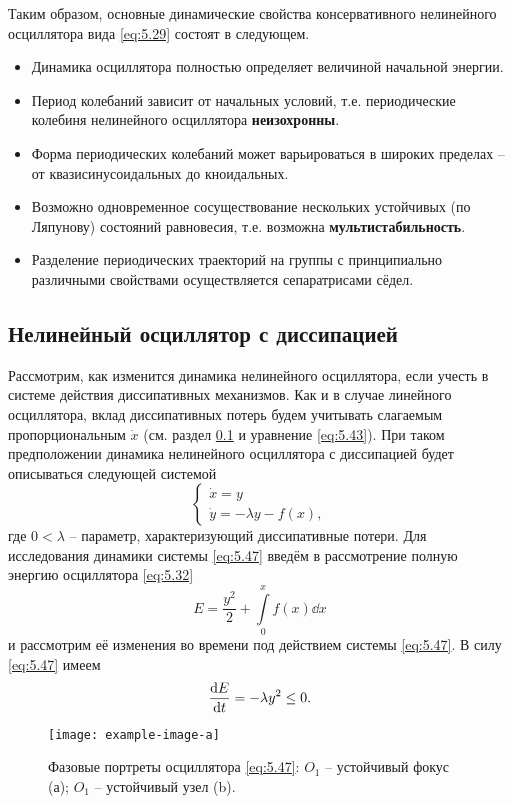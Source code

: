 Таким образом, основные динамические свойства консервативного нелинейного осциллятора вида \eqref{eq:5.29} состоят в следующем.
\begin{itemize}
        \item Динамика осциллятора полностью определяет величиной начальной энергии.
        \item Период колебаний зависит от начальных условий, т.е. периодические колебиня нелинейного осциллятора \textbf{неизохронны}.
        \item Форма периодических колебаний может варьироваться в широких пределах -- от квазисинусоидальных до кноидальных.
        \item Возможно одновременное сосуществование нескольких устойчивых (по Ляпунову) состояний равновесия, т.е. возможна \textbf{мультистабильность}.
\item Разделение периодических траекторий на группы с принципиально различными свойствами осуществляется сепаратрисами сёдел.
\end{itemize}

\subsection{Нелинейный осциллятор с диссипацией}%
\label{sub:5.2.2}

Рассмотрим, как изменится динамика нелинейного осциллятора, если
учесть в системе действия диссипативных механизмов. Как и в случае
линейного осциллятора, вклад диссипативных потерь будем учитывать
слагаемым пропорциональным $\dot x$ (см. раздел \ref{sub:5.2.2} и уравнение \eqref{eq:5.43}). При
таком предположении динамика нелинейного осциллятора с диссипацией будет
описываться следующей системой
\begin{equation}
        \label{eq:5.47}
        \begin{cases}
                \dot x = y\\
                \dot y = - \lambda y - f(x),
        \end{cases}
\end{equation}
где $0< \lambda$ -- параметр, характеризующий диссипативные потери. Для исследования динамики системы \eqref{eq:5.47} введём в рассмотрение полную энергию осциллятора \eqref{eq:5.32}
\begin{equation}
        \label{eq:}
        E = \frac{y^2}{2} + \int\limits_{0}^{x} f(x) \dd{x} 
\end{equation}
и рассмотрим её изменения во времени под действием системы \eqref{eq:5.47}. В силу \eqref{eq:5.47}
имеем
\begin{equation}
        \label{eq:5.48}
        \dv{E}{t} = -\lambda y^2 \leq 0.
\end{equation}
\begin{figure}[h]
        \centering
        \texttt{[image: example-image-a]}
        \caption{Фазовые портреты осциллятора \eqref{eq:5.47}: $O_1$ -- устойчивый фокус (а); $O_1$ -- устойчивый узел (b).}
        \label{fig:5.11}
\end{figure}



